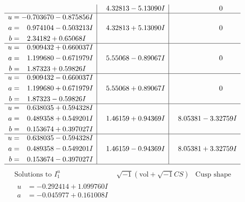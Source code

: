 \documentclass[1p]{elsarticle_modified}
\theoremstyle{definition}
\newcommand{\I}{\sqrt{-1}}
\begin{document}
$$\begin{array}{c|c|c}
 & \phantom{-}4.32813 - 5.13090 I & \phantom{-0.000000 } 0 \\ \hline\begin{aligned}
u &= -0.703670 - 0.875856 I \\
a &= \phantom{-}0.974104 - 0.503213 I \\
b &= \phantom{-}2.34182 + 0.65068 I\end{aligned}
 & \phantom{-}4.32813 + 5.13090 I & \phantom{-0.000000 } 0 \\ \hline\begin{aligned}
u &= \phantom{-}0.909432 + 0.660037 I \\
a &= \phantom{-}1.199680 - 0.671979 I \\
b &= \phantom{-}1.87323 + 0.59826 I\end{aligned}
 & \phantom{-}5.55068 - 0.89067 I & \phantom{-0.000000 } 0 \\ \hline\begin{aligned}
u &= \phantom{-}0.909432 - 0.660037 I \\
a &= \phantom{-}1.199680 + 0.671979 I \\
b &= \phantom{-}1.87323 - 0.59826 I\end{aligned}
 & \phantom{-}5.55068 + 0.89067 I & \phantom{-0.000000 } 0 \\ \hline\begin{aligned}
u &= \phantom{-}0.638035 + 0.594328 I \\
a &= \phantom{-}0.489358 + 0.549201 I \\
b &= \phantom{-}0.153674 + 0.397027 I\end{aligned}
 & \phantom{-}1.46159 + 0.94369 I & \phantom{-}8.05381 - 3.32759 I \\ \hline\begin{aligned}
u &= \phantom{-}0.638035 - 0.594328 I \\
a &= \phantom{-}0.489358 - 0.549201 I \\
b &= \phantom{-}0.153674 - 0.397027 I\end{aligned}
 & \phantom{-}1.46159 - 0.94369 I & \phantom{-}8.05381 + 3.32759 I\\
 \hline 
 \end{array}$$\newpage$$\begin{array}{c|c|c}  
\text{Solutions to }I^u_{1}& \I (\text{vol} + \sqrt{-1}CS) & \text{Cusp shape}\\
 \hline 
\begin{aligned}
u &= -0.292414 + 1.099760 I \\
a &= -0.045977 + 0.161008 I \\

\end{aligned}
\end{array}$$
\end{document}
